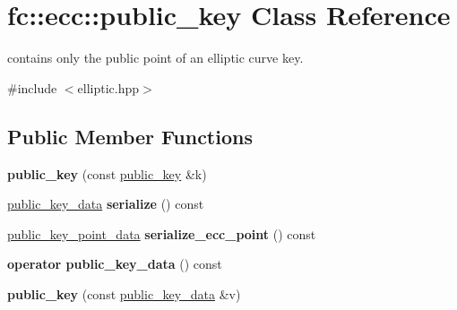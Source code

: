 \hypertarget{classfc_1_1ecc_1_1public__key}{}\section{fc\+:\+:ecc\+:\+:public\+\_\+key Class Reference}
\label{classfc_1_1ecc_1_1public__key}


contains only the public point of an elliptic curve key.  




{\ttfamily \#include $<$elliptic.\+hpp$>$}

\subsection*{Public Member Functions}
\begin{DoxyCompactItemize}
\item 
\mbox{\label{classfc_1_1ecc_1_1public__key_ad624a05c27f37e50c9f349f1b8c94869}} 
{\bfseries public\+\_\+key} (const \mbox{\hyperlink{classfc_1_1ecc_1_1public__key}{public\+\_\+key}} \&k)
\item 
\mbox{\label{classfc_1_1ecc_1_1public__key_a3e58b71d655beb4a4c8022a2cee76abd}} 
\mbox{\hyperlink{classfc_1_1array}{public\+\_\+key\+\_\+data}} {\bfseries serialize} () const
\item 
\mbox{\label{classfc_1_1ecc_1_1public__key_ae14be867e990851e8d2cc770532d905e}} 
\mbox{\hyperlink{classfc_1_1array}{public\+\_\+key\+\_\+point\+\_\+data}} {\bfseries serialize\+\_\+ecc\+\_\+point} () const
\item 
\mbox{\label{classfc_1_1ecc_1_1public__key_a4123143ccd9ce438a44a88738fc5e493}} 
{\bfseries operator public\+\_\+key\+\_\+data} () const
\item 
\mbox{\label{classfc_1_1ecc_1_1public__key_a03f2eebbb9efd1d8d02ddcb8aa15385a}} 
{\bfseries public\+\_\+key} (const \mbox{\hyperlink{classfc_1_1array}{public\+\_\+key\+\_\+data}} \&v)
\item 
\mbox{\label{classfc_1_1ecc_1_1public__key_a44343b2fc4a86879f66b2ecd3cf8a1f2}} 

\end{DoxyCompactItemize}
